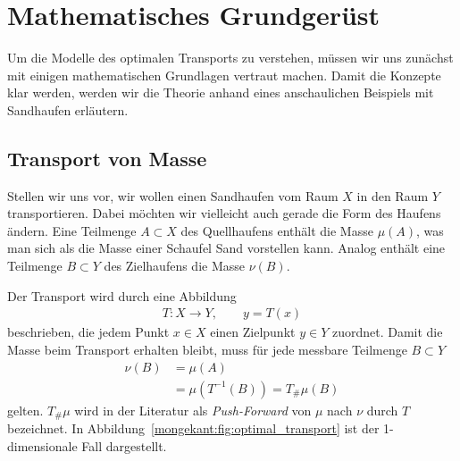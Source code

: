 %
%
%
%
\section{Mathematisches Grundgerüst\label{mongekant:section:teil0}}

Um die Modelle des optimalen Transports zu verstehen,
müssen wir uns zunächst mit einigen mathematischen Grundlagen vertraut machen.
Damit die Konzepte klar werden,
werden wir die Theorie anhand eines anschaulichen Beispiels mit Sandhaufen erläutern.

\subsection{Transport von Masse\label{mongekant:subection:transport}}
Stellen wir uns vor,
wir wollen einen Sandhaufen vom Raum $X$
in den Raum $Y$ transportieren.
Dabei möchten wir vielleicht auch gerade die Form des Haufens ändern.
Eine Teilmenge $A\subset X$ des Quellhaufens enthält die Masse $\mu(A)$,
was man sich als die Masse einer Schaufel Sand vorstellen kann.
Analog enthält eine Teilmenge $B\subset Y$ des Zielhaufens die Masse $\nu(B)$.

Der Transport wird durch eine Abbildung
\begin{align*}
T\colon X\to Y
,\qquad y=T(x)
\end{align*}
beschrieben,
die jedem Punkt $x\in X$ einen Zielpunkt $y\in Y$ zuordnet.
Damit die Masse beim Transport erhalten bleibt,
muss für jede messbare Teilmenge $B\subset Y$
\begin{align*}
\nu(B)
&=
\mu(A)
\\
&=
\mu\left(T^{-1}(B)\right)
=
T_{\#}\mu(B)
\end{align*}
gelten.
$T_{\#}\mu$ wird in der Literatur als \emph{Push-Forward} von $\mu$ nach $\nu$ durch $T$ bezeichnet.
In Abbildung~\ref{mongekant:fig:optimal_transport} ist der 1-dimensionale Fall dargestellt.

